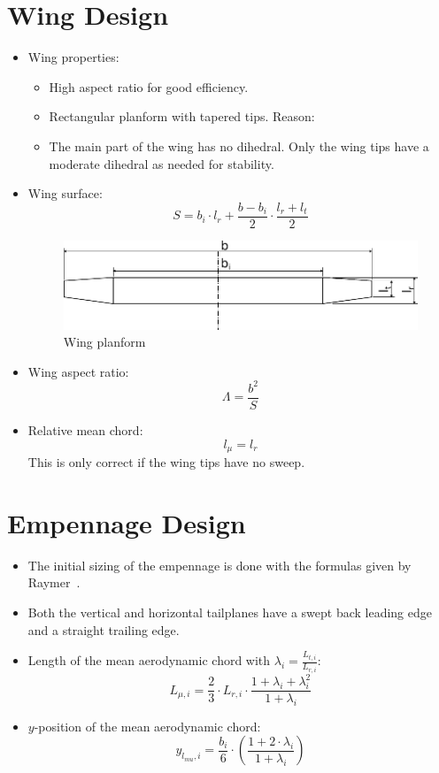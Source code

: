 \documentclass[a4paper,12pt]{scrartcl}
\begin{document}
\section{Wing Design}

\begin{itemize}
	\item Wing properties:
		\begin{itemize}
			\item High aspect ratio for good efficiency.
			\item Rectangular planform with tapered tips. Reason:
			\item The main part of the wing has no dihedral. Only the wing tips have a moderate dihedral as needed for stability.
		\end{itemize}
	\item Wing surface:
		\[
			S = b_i \cdot l_r + \frac{b-b_i}{2} \cdot \frac{l_r + l_t}{2}
		\]
		\begin{figure}
			\includegraphics[width = \textwidth]{wing_planform}
			\caption{Wing planform}
			\label{fig:wing-planform}
		\end{figure}
	\item Wing aspect ratio:
		\[
			\Lambda = \frac{b^2}{S}
		\]
	\item Relative mean chord:
		\[
			l_\mu = l_r
		\]
		This is only correct if the wing tips have no sweep.
\end{itemize}

\section{Empennage Design}
\begin{itemize}
	\item The initial sizing of the empennage is done with the formulas given by Raymer~\cite[p. 112]{raymer}.
	\item Both the vertical and horizontal tailplanes have a swept back leading edge and a straight trailing edge.
	\item Length of the mean aerodynamic chord with $\lambda_i = \frac{L_{t,i}}{L_{r,i}}$:
		\[
			L_{\mu, i} = \frac{2}{3} \cdot L_{r,i} \cdot \frac{1 + \lambda_i + \lambda_i^2}{1 + \lambda_i}
		\]
	\item $y$-position of the mean aerodynamic chord:
		\[
			y_{l_{mu},i} = \frac{b_i}{6} \cdot \left( \frac{1+2 \cdot \lambda_i}{1 + \lambda_i}\right)
		\]
\end{itemize}
\end{document}
